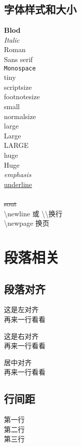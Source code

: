 \documentclass{article}
\begin{document}
			\subsection{字体样式和大小}
			\textbf{Blod}			\\
			\textit{Italic}			\\
			\textrm{Roman}			\\
			\textsf{Sans serif}			\\
			\texttt{Monospace}			\\
			\tiny tiny \\
			\scriptsize scriptsize \\
			\footnotesize footnotesize \\
			\small small \\
			\normalsize normalsize \\
			\large large \\
			\Large Large \\
			\LARGE LARGE \\
			\huge huge \\
			\Huge Huge \\
			\normalsize  
			\emph{emphasis}  \\
			\underline{underline}	\\
			 \\
			\sout{sout}  \\
			\textbackslash newline {} 或 {} \textbackslash \textbackslash 换行			\\
			\textbackslash newpage {}换页 \\
		\section{段落相关}
			\subsection{段落对齐}
			\begin{flushleft}
				这是左对齐  \\
				再来一行看看
			\end{flushleft}
			\begin{flushright}
				这是右对齐  \\
				再来一行看看
			\end{flushright}
			\begin{center}
				居中对齐				\\
				再来一行看看
			\end{center}
			\subsection{行间距}
			\begin{spacing}{2.0}
			第一行\\第二行\\第三行\\
			\end{spacing}
\end{document}
